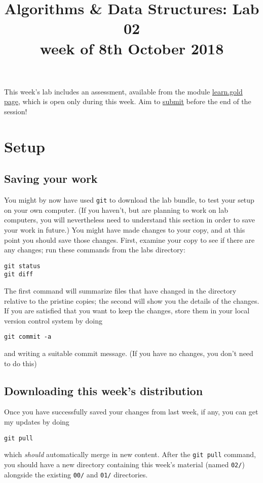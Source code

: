 \documentclass[11pt]{article}
\date{}
\title{Algorithms \& Data Structures: Lab 02\\\medskip
\large week of 8th October 2018}
\begin{document}
\maketitle
This week's lab includes an assessment, available from the module
\href{https://learn.gold.ac.uk/course/view.php?id=11491}{learn.gold page}, which is open only during this week.  Aim
to \href{https://learn.gold.ac.uk/mod/lti/view.php?id=605172}{submit} before the end of the session!

\section{Setup}
\label{sec:org0100ffd}
\subsection{Saving your work}
\label{sec:org17329d4}
You might by now have used \texttt{git} to download the lab bundle, to
test your setup on your own computer.  (If you haven't, but are
planning to work on lab computers, you will nevertheless need to
understand this section in order to save your work in future.)  You
might have made changes to your copy, and at this point you should
save those changes.  First, examine your copy to see if there are
any changes; run these commands from the labs directory:
\begin{verbatim}
git status
git diff
\end{verbatim}
The first command will summarize files that have changed in the
directory relative to the pristine copies; the second will show you
the details of the changes.  If you are satisfied that you want to
keep the changes, store them in your local version control system
by doing
\begin{verbatim}
git commit -a
\end{verbatim}
and writing a suitable commit message.  (If you have no changes,
you don't need to do this)
\subsection{Downloading this week's distribution}
\label{sec:org2cb99aa}
Once you have successfully saved your changes from last week, if
any, you can get my updates by doing
\begin{verbatim}
git pull
\end{verbatim}
which \emph{should} automatically merge in new content.  After the \texttt{git
   pull} command, you should have a new directory containing this
week's material (named \texttt{02/}) alongside the existing \texttt{00/} and
\texttt{01/} directories.
\end{document}
